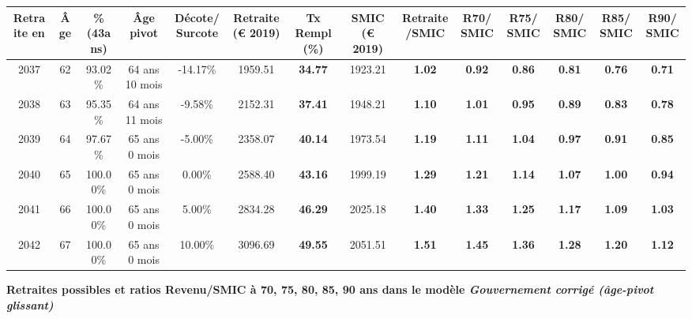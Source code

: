 \begin{adjustbox}{max width=\textwidth} 
\begin{tabular}[htb]{|c|c||c|c|c||c|c||c|c||c|c|c|c|c|} 
\hline 
 Retraite en &  Âge &  \%(43ans) &  Âge pivot &  Décote/Surcote &  Retraite (\euro{} 2019) &  Tx Rempl(\%) &  SMIC (\euro{} 2019) &  Retraite/SMIC &  R70/SMIC &  R75/SMIC &  R80/SMIC &  R85/SMIC &  R90/SMIC \\ 
\hline \hline 
 2037 &  62 &  93.02\% &  64 ans 10 mois &  -14.17\% &  1959.51 &  {\bf 34.77} &  1923.21 &  {\bf 1.02} &  {\bf {\color{red} 0.92}} &  {\bf {\color{red} 0.86}} &  {\bf {\color{red} 0.81}} &  {\bf {\color{red} 0.76}} &  {\bf {\color{red} 0.71}} \\ 
\hline 
 2038 &  63 &  95.35\% &  64 ans 11 mois &  -9.58\% &  2152.31 &  {\bf 37.41} &  1948.21 &  {\bf 1.10} &  {\bf 1.01} &  {\bf {\color{red} 0.95}} &  {\bf {\color{red} 0.89}} &  {\bf {\color{red} 0.83}} &  {\bf {\color{red} 0.78}} \\ 
\hline 
 2039 &  64 &  97.67\% &  65 ans 0 mois &  -5.00\% &  2358.07 &  {\bf 40.14} &  1973.54 &  {\bf 1.19} &  {\bf 1.11} &  {\bf 1.04} &  {\bf {\color{red} 0.97}} &  {\bf {\color{red} 0.91}} &  {\bf {\color{red} 0.85}} \\ 
\hline 
 2040 &  65 &  100.00\% &  65 ans 0 mois &  0.00\% &  2588.40 &  {\bf 43.16} &  1999.19 &  {\bf 1.29} &  {\bf 1.21} &  {\bf 1.14} &  {\bf 1.07} &  {\bf {\color{red} 1.00}} &  {\bf {\color{red} 0.94}} \\ 
\hline 
 2041 &  66 &  100.00\% &  65 ans 0 mois &  5.00\% &  2834.28 &  {\bf 46.29} &  2025.18 &  {\bf 1.40} &  {\bf 1.33} &  {\bf 1.25} &  {\bf 1.17} &  {\bf 1.09} &  {\bf 1.03} \\ 
\hline 
 2042 &  67 &  100.00\% &  65 ans 0 mois &  10.00\% &  3096.69 &  {\bf 49.55} &  2051.51 &  {\bf 1.51} &  {\bf 1.45} &  {\bf 1.36} &  {\bf 1.28} &  {\bf 1.20} &  {\bf 1.12} \\ 
\hline 
\hline 
\end{tabular} 
\end{adjustbox} 
 
 \vspace{0.1cm} 
{\bf \noindent Retraites possibles et ratios Revenu/SMIC à 70, 75, 80, 85, 90 ans dans le modèle \emph{Gouvernement corrigé (âge-pivot glissant)}}  
 
